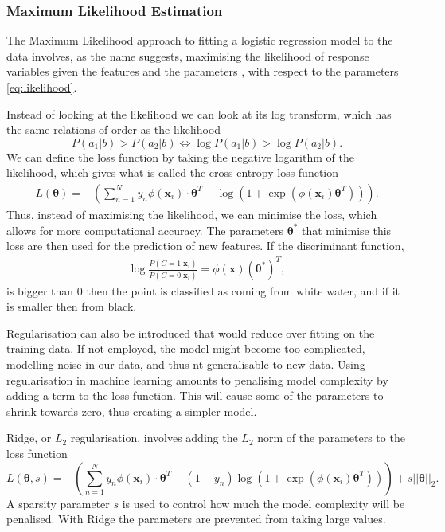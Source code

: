 \subsubsection{Maximum Likelihood Estimation}

The Maximum Likelihood approach to fitting a logistic regression model to the data involves, as the name suggests, maximising the likelihood of response variables given the features and the parameters , with respect to the parameters \eqref{eq:likelihood}.

Instead of looking at the likelihood we can look at its log transform, which has the same relations of order as the likelihood
\begin{equation}
	P(a_1|b) > P(a_2|b) \Leftrightarrow 	\log P(a_1|b) >\log P(a_2|b).
\end{equation} 
We can define the loss function by taking the negative logarithm of the likelihood, which gives what is called the cross-entropy loss function
\begin{align}
	L(\bm{\theta})= - \left(\sum_{n=1}^N y_n \phi\left(\mathbf{x}_{i}\right)\cdot\bm{\theta}^{T} -\log\left(1+\exp\left(\phi\left(\mathbf{x}_{i}\right)\bm{\theta}^{T}\right)\right) \right).
\end{align}
Thus, instead of maximising the likelihood, we can minimise the loss, which allows for more computational accuracy.  
The parameters $\bm{\theta}^*$ that minimise this loss are then used for the prediction of new features. If the discriminant function,
\begin{align}
	 \log \frac{P(C=1 |  \mathbf{x}_i)}{P(C = 0 |  \mathbf{x}_i)} = \phi( \mathbf{x}) (\bm{\theta}^*)^T,
\end{align}
 is bigger than 0 then the point is classified as coming from white water, and if it is smaller then from black. 
 
 Regularisation can also be introduced that would reduce over fitting on the training data. If not employed, the model might become too complicated, modelling noise in our data, and thus nt generalisable to new data. Using regularisation in machine learning amounts to penalising model complexity by adding a term to the loss function. This will cause some of the parameters to shrink towards zero, thus creating a simpler model.
 
 Ridge, or $L_2$ regularisation, involves adding the $L_2$ norm of the parameters to the loss function
 \begin{equation}
 		L(\bm{\theta},s)= - \left(\sum_{n=1}^N y_n \phi\left(\mathbf{x}_{i}\right)\cdot\bm{\theta}^{T} -\left(1-y_n\right)\log\left(1+\exp\left(\phi\left(\mathbf{x}_{i}\right)\bm{\theta}^{T}\right)\right) \right) + s||\bm{\theta}||_2.
 \end{equation}
  A sparsity parameter $s$ is used to control how much the model complexity will be penalised. With Ridge the parameters are prevented from taking large values.
  
